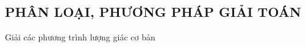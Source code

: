 
\subsection{PHÂN LOẠI, PHƯƠNG PHÁP GIẢI TOÁN}

\begin{dang}{Giải các phương trình lượng giác cơ bản}

\end{dang}

